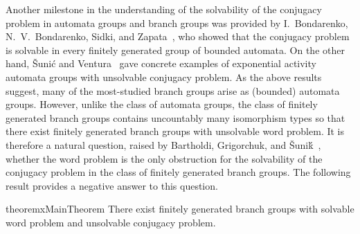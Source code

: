\documentclass[a4paper]{amsart}
\numberwithin{equation}{section}
\theoremstyle{definition}
\theoremstyle{remark}
\begin{document}
Another milestone in the understanding of the solvability of the conjugacy problem in automata groups and branch groups was provided by I.\ Bondarenko, N.\ V.\ Bondarenko, Sidki, and Zapata~\cite{BondarenkoBondarenkoSidkiZapata2013}, who showed that the conjugacy problem is solvable in every finitely generated group of bounded automata.
On the other hand, \v Suni\'c and Ventura~\cite{SunicVentura2012} gave concrete examples of exponential activity automata groups with unsolvable conjugacy problem.
As the above results suggest, many of the most-studied branch groups arise as (bounded) automata groups.
However, unlike the class of automata groups, the class of finitely generated branch groups contains uncountably many isomorphism types so that there exist finitely generated branch groups with unsolvable word problem.
It is therefore a natural question, raised by Bartholdi, Grigorchuk, and \v{S}uni\'{k}~\cite[Question 5]{BGS-branch}, whether the word problem is the only obstruction for the solvability of the conjugacy problem in the class of finitely generated branch groups.
The following result provides a negative answer to this question.

\begin{restatable}{theoremx}{MainTheorem}\label{thm:main-existence-branch}
There exist finitely generated branch groups with solvable word problem and unsolvable conjugacy problem.
\end{restatable}
\end{document}
